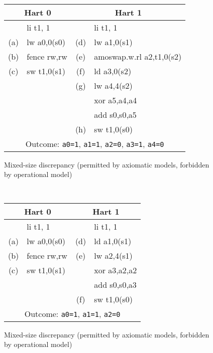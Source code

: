 \begin{figure}[h!]
  \centering\small
  {\tt
    \begin{tabular}{cl||cl}
    \multicolumn{2}{c}{Hart 0} & \multicolumn{2}{c}{Hart 1} \\
    \hline
          & li t1, 1    &     & li t1, 1    \\
      (a) & lw a0,0(s0) & (d) & lw a1,0(s1) \\
      (b) & fence rw,rw & (e) & amoswap.w.rl a2,t1,0(s2) \\
      (c) & sw t1,0(s1) & (f) & ld a3,0(s2) \\
          &             & (g) & lw a4,4(s2) \\
          &             &     & xor a5,a4,a4  \\
          &             &     & add s0,s0,a5  \\
          &             & (h) & sw t1,0(s0)   \\
      \hline
      \multicolumn{4}{c}{Outcome: {\tt a0=1}, {\tt a1=1}, {\tt a2=0}, {\tt a3=1}, {\tt a4=0}}
    \end{tabular}
  }
  \caption{Mixed-size discrepancy (permitted by axiomatic models, forbidden by operational model)}
  \label{fig:litmus:discrepancy:rsw1}
\end{figure}

\begin{figure}[h!]
  \centering\small
  {\tt
    \begin{tabular}{cl||cl}
    \multicolumn{2}{c}{Hart 0} & \multicolumn{2}{c}{Hart 1} \\
    \hline
          & li t1, 1    &     & li t1, 1      \\
      (a) & lw a0,0(s0) & (d) & ld a1,0(s1)   \\
      (b) & fence rw,rw & (e) & lw a2,4(s1)   \\
      (c) & sw t1,0(s1) &     & xor a3,a2,a2  \\
          &             &     & add s0,s0,a3  \\
          &             & (f) & sw t1,0(s0)   \\
      \hline
      \multicolumn{4}{c}{Outcome: {\tt a0=1}, {\tt a1=1}, {\tt a2=0}}
    \end{tabular}
  }
  \caption{Mixed-size discrepancy (permitted by axiomatic models, forbidden by operational model)}
  \label{fig:litmus:discrepancy:rsw2}
\end{figure}

